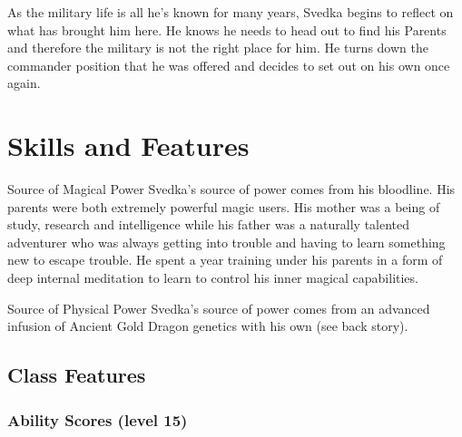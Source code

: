 \documentclass[letterpaper,10pt,twoside,twocolumn,openany]{book}
\begin{document}
As the military life is all he's known for many years, Svedka begins to reflect on what has brought him here. He knows he needs to head out to find his Parents and therefore the military is not the right place for him. He turns down the commander position that he was offered and decides to set out on his own once again.

\twocolumn

\chapter{Skills and Features}

\begin{paperbox}[float=!t]{Source of Magical Power}
	Svedka's source of power comes from his bloodline. His parents were both extremely powerful magic users. His mother was a being of study, research and intelligence while his father was a naturally talented adventurer who was always getting into trouble and having to learn something new to escape trouble. He spent a year training under his parents in a form of deep internal meditation to learn to control his inner magical capabilities.
\end{paperbox}

\begin{paperbox}[float=!t]{Source of Physical Power}
	Svedka's source of power comes from an advanced infusion of Ancient Gold Dragon genetics with his own (see back story).
\end{paperbox}

\section{Class Features}

\subsection{Ability Scores (level 15)}
\stats[
STR = \stat{},
DEX = \stat{},
CON = \stat{},
INT = \stat{},
WIS = \stat{},
CHA = \stat{}
]
\end{document}
